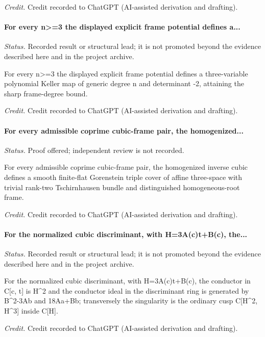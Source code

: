 \emph{Credit.} Credit recorded to ChatGPT (AI-assisted derivation and drafting).

\label{supp-note-01-031}
\paragraph{For every n>=3 the displayed explicit frame potential defines a...}
\emph{Status.} Recorded result or structural lead; it is not promoted beyond the evidence described here and in the project archive.

For every n>=3 the displayed explicit frame potential defines a three-variable polynomial Keller map of generic degree n and determinant -2, attaining the sharp frame-degree bound.

\emph{Credit.} Credit recorded to ChatGPT (AI-assisted derivation and drafting).

\label{supp-note-01-032}
\paragraph{For every admissible coprime cubic-frame pair, the homogenized...}
\emph{Status.} Proof offered; independent review is not recorded.

For every admissible coprime cubic-frame pair, the homogenized inverse cubic defines a smooth finite-flat Gorenstein triple cover of affine three-space with trivial rank-two Tschirnhausen bundle and distinguished homogeneous-root frame.

\emph{Credit.} Credit recorded to ChatGPT (AI-assisted derivation and drafting).

\label{supp-note-01-033}
\paragraph{For the normalized cubic discriminant, with H=3A(c)t+B(c), the...}
\emph{Status.} Recorded result or structural lead; it is not promoted beyond the evidence described here and in the project archive.

For the normalized cubic discriminant, with H=3A(c)t+B(c), the conductor in C[c, t] is H\textasciicircum{}2 and the conductor ideal in the discriminant ring is generated by B\textasciicircum{}2-3Ab and 18Aa+Bb; transversely the singularity is the ordinary cusp C[H\textasciicircum{}2, H\textasciicircum{}3] inside C[H].

\emph{Credit.} Credit recorded to ChatGPT (AI-assisted derivation and drafting).

